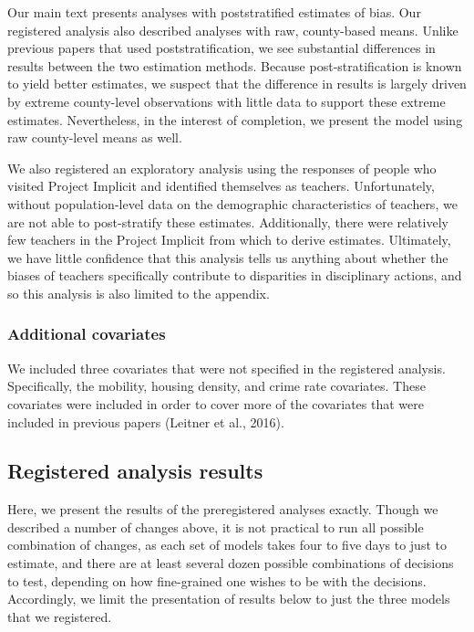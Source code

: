 \documentclass[english,floatsintext,man]{apa6}
\theoremstyle{definition}
\theoremstyle{definition}
\theoremstyle{remark}
\begin{document}
Our main text presents analyses with poststratified estimates of bias.
Our registered analysis also described analyses with raw, county-based
means. Unlike previous papers that used poststratification, we see
substantial differences in results between the two estimation methods.
Because post-stratification is known to yield better estimates, we
suspect that the difference in results is largely driven by extreme
county-level observations with little data to support these extreme
estimates. Nevertheless, in the interest of completion, we present the
model using raw county-level means as well.

We also registered an exploratory analysis using the responses of people
who visited Project Implicit and identified themselves as teachers.
Unfortunately, without population-level data on the demographic
characteristics of teachers, we are not able to post-stratify these
estimates. Additionally, there were relatively few teachers in the
Project Implicit from which to derive estimates. Ultimately, we have
little confidence that this analysis tells us anything about whether the
biases of teachers specifically contribute to disparities in
disciplinary actions, and so this analysis is also limited to the
appendix.

\subsubsection{Additional covariates}\label{additional-covariates}

We included three covariates that were not specified in the registered
analysis. Specifically, the mobility, housing density, and crime rate
covariates. These covariates were included in order to cover more of the
covariates that were included in previous papers (Leitner et al., 2016).

\subsection{Registered analysis
results}\label{registered-analysis-results}

Here, we present the results of the preregistered analyses exactly.
Though we described a number of changes above, it is not practical to
run all possible combination of changes, as each set of models takes
four to five days to just to estimate, and there are at least several
dozen possible combinations of decisions to test, depending on how
fine-grained one wishes to be with the decisions. Accordingly, we limit
the presentation of results below to just the three models that we
registered.
\end{document}
